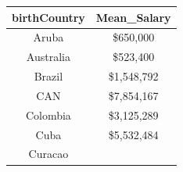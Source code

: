 \documentclass[]{book}
\theoremstyle{definition}
\theoremstyle{definition}
\theoremstyle{definition}
\theoremstyle{remark}
\begin{document}
\begin{longtable}[]{@{}cc@{}}
\toprule
\begin{minipage}[b]{0.20\columnwidth}\centering
birthCountry\strut
\end{minipage} & \begin{minipage}[b]{0.20\columnwidth}\centering
Mean\_Salary\strut
\end{minipage}\tabularnewline
\midrule
\endhead
\begin{minipage}[t]{0.20\columnwidth}\centering
Aruba\strut
\end{minipage} & \begin{minipage}[t]{0.20\columnwidth}\centering
\$650,000\strut
\end{minipage}\tabularnewline
\begin{minipage}[t]{0.20\columnwidth}\centering
Australia\strut
\end{minipage} & \begin{minipage}[t]{0.20\columnwidth}\centering
\$523,400\strut
\end{minipage}\tabularnewline
\begin{minipage}[t]{0.20\columnwidth}\centering
Brazil\strut
\end{minipage} & \begin{minipage}[t]{0.20\columnwidth}\centering
\$1,548,792\strut
\end{minipage}\tabularnewline
\begin{minipage}[t]{0.20\columnwidth}\centering
CAN\strut
\end{minipage} & \begin{minipage}[t]{0.20\columnwidth}\centering
\$7,854,167\strut
\end{minipage}\tabularnewline
\begin{minipage}[t]{0.20\columnwidth}\centering
Colombia\strut
\end{minipage} & \begin{minipage}[t]{0.20\columnwidth}\centering
\$3,125,289\strut
\end{minipage}\tabularnewline
\begin{minipage}[t]{0.20\columnwidth}\centering
Cuba\strut
\end{minipage} & \begin{minipage}[t]{0.20\columnwidth}\centering
\$5,532,484\strut
\end{minipage}\tabularnewline
\begin{minipage}[t]{0.20\columnwidth}\centering
Curacao\strut
\end{minipage} & \begin{minipage}[t]{0.20\columnwidth}\centering

\end{minipage}
\end{longtable}
\end{document}
